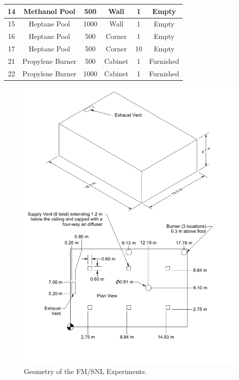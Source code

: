 \begin{table}[!ht]
\begin{center}
\begin{tabular}{|c|c|c|c|c|c|}
14      & Methanol Pool     &     500       & Wall          & 1                 & Empty                  \\ \hline
15      & Heptane Pool      &    1000       & Wall          & 1                 & Empty                  \\ \hline
16      & Heptane Pool      &     500       & Corner        & 1                 & Empty                  \\ \hline
17      & Heptane Pool      &     500       & Corner        & 10                & Empty                  \\ \hline
21      & Propylene Burner  &     500       & Cabinet       & 1                 & Furnished              \\ \hline
22      & Propylene Burner  &    1000       & Cabinet       & 1                 & Furnished              \\ \hline
\end{tabular}
\end{center}
\label{FM_SNL_Matrix}
\end{table}



\begin{figure}[p]
\includegraphics[width=\textwidth]{FIGURES/FM_SNL/FM_SNL_Drawing}
\caption[Geometry of the FM/SNL Experiments]{Geometry of the FM/SNL Experiments.}
\label{FM_SNL_Drawing}
\end{figure}

